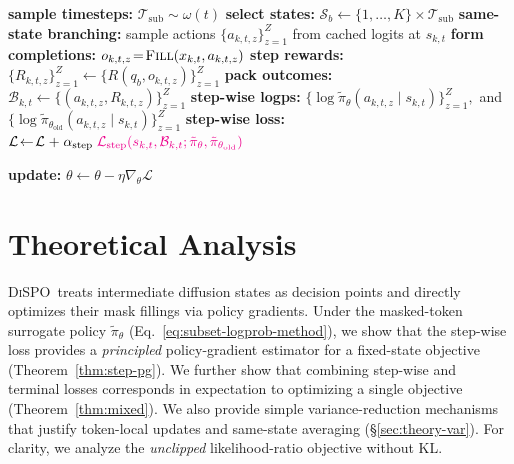 \documentclass{article}
\newcommand{\method}{{\textsc{DiSPO}}}
\theoremstyle{plain}
\theoremstyle{definition}
\theoremstyle{remark}
\begin{document}
\begin{algorithm}[t]
\begin{algorithmic}[1]
    \begin{tcolorbox}[colback=Magenta!4, colframe=Magenta!3, boxrule=-1pt, left=0pt, right=0pt, top=-1pt, bottom=-2pt]
    \STATE \textbf{sample timesteps:} $\mathcal{T}_{\mathrm{sub}} \sim \omega(t)$
    \STATE \textbf{select states:} $\mathcal{S}_b \leftarrow \{1,\dots,K\}\times \mathcal{T}_{\mathrm{sub}}$
        \STATE \textbf{same-state branching:} sample actions $\{a_{k,t,z}\}_{z=1}^Z$ from cached logits at $s_{k,t}$
        \STATE \textbf{form completions:} $o_{k,t,z}\!=\!\textsc{Fill}(x_{k,t},a_{k,t,z})$
        \STATE \textbf{step rewards:} \!$\{R_{k,t,z}\}_{z=1}^Z \!\!\leftarrow\! \{R(q_b,o_{k,t,z})\}_{z=1}^Z$
        \STATE \textbf{pack outcomes:} $\mathcal{B}_{k,t} \!\leftarrow \!\{(a_{k,t,z},R_{k,t,z})\}_{z=1}^Z$
        \STATE \textbf{step-wise logps:} 
        $\{\log\tilde{\pi}_\theta(a_{k,t,z}\!\!\mid\!\! s_{k,t})\}_{z=1}^Z,$ and \\
        $\{\log\tilde{\pi}_{\theta_{\mathrm{old}}}(a_{k,t,z}\!\!\mid\!\! s_{k,t})\}_{z=1}^Z$
        \STATE \textbf{step-wise loss:} \\
        $\mathcal{L} \!\leftarrow\! \mathcal{L} \mathrel{+} \alpha_{\mathrm{step}}\;\textcolor{Magenta}{\mathcal{L}_{\mathrm{step}}(s_{k,t},\mathcal{B}_{k,t};\tilde{\pi}_\theta,\tilde{\pi}_{\theta_{\mathrm{old}}})}$
    \ENDFOR
    \end{tcolorbox}
  \ENDFOR
  \STATE \textbf{update:} $\theta \leftarrow \theta - \eta \nabla_\theta \mathcal{L}$ 
\end{algorithmic}
\end{algorithm}


\section{Theoretical Analysis}
\label{sec:theory}
\method\ treats intermediate diffusion states as decision points and directly optimizes their mask fillings via policy gradients.
Under the masked-token surrogate policy $\tilde{\pi}_\theta$ (Eq.~\ref{eq:subset-logprob-method}), 
we show that the step-wise loss provides a \emph{principled} policy-gradient estimator for a fixed-state objective (Theorem~\ref{thm:step-pg}).
We further show that combining step-wise and terminal losses corresponds in expectation to optimizing a single objective (Theorem~\ref{thm:mixed}).
We also provide simple variance-reduction mechanisms that justify token-local updates and same-state averaging (\S\ref{sec:theory-var}).
For clarity, we analyze the \emph{unclipped} likelihood-ratio objective without KL.
\end{document}
